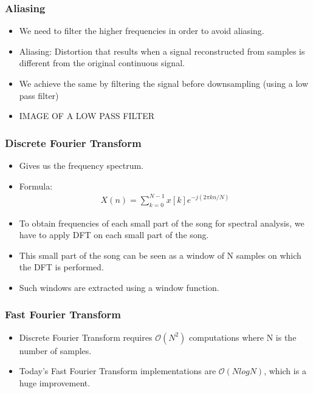 \documentclass{beamer}
\begin{document}
\begin{frame}[t]
    \frametitle{Aliasing}   
    \begin{itemize}
        \item We need to filter the higher frequencies in order to avoid aliasing.
        \item \alert{Aliasing}: Distortion that results when a signal reconstructed from samples is different from the original continuous signal.
        \item We achieve the same by filtering the signal before downsampling (using a low pass filter)
        \item IMAGE OF A LOW PASS FILTER       
    \end{itemize}
\end{frame}

\begin{frame}[t]
    \frametitle{Discrete Fourier Transform}
    \begin{itemize}
        \item Gives us the frequency spectrum.
        \item Formula: 
            \begin{align*}
                X(n) = \sum_{k=0}^{N-1} x[k] e^{-j(2\pi kn/N)}
            \end{align*}
        \item To obtain frequencies of each small part of the song for spectral analysis, we have to apply DFT on each small part of the song.
        \item This small part of the song can be seen as a window of N samples on which the DFT is performed.
        \item Such windows are extracted using a \alert{window function}.
    \end{itemize}
\end{frame}

\begin{frame}[t]
    \frametitle{Fast Fourier Transform}
    \begin{itemize}
        \item Discrete Fourier Transform requires \(\mathcal{O}(N^2)\) computations where N is the number of samples.
        \item Today's Fast Fourier Transform implementations are \(\mathcal{O}(NlogN)\), which is a huge improvement.
    \end{itemize}
\end{frame}
\end{document}
